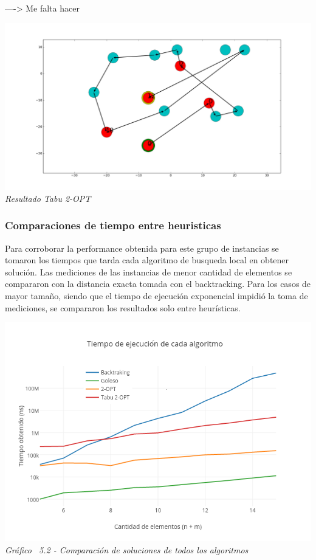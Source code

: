     ----> Me falta hacer
    \vspace*{0.3cm} \vspace*{0.3cm}
  \begin{center}
\includegraphics[scale=0.3]{./EJ5/caminoTabu.png}
\\{\textit{Resultado Tabu 2-OPT}}
  \end{center}
  \vspace*{0.3cm}


\subsubsection{Comparaciones de tiempo entre heuristicas}

Para corroborar la performance obtenida para este grupo de instancias se tomaron los tiempos que tarda cada algoritmo de busqueda local en obtener soluci\'on. 
 Las mediciones de las instancias de menor cantidad de elementos se compararon con la distancia exacta tomada con el backtracking. Para los casos de mayor tamaño, siendo que el tiempo de ejecución exponencial impidió la toma de mediciones, se compararon los resultados solo entre heurísticas.


\vspace*{0.3cm} \vspace*{0.3cm}
  \begin{center}
 \includegraphics[scale=0.5]{./EJ5/medicionTodos.png}\\
 {\textit{Gráfico \ 5.2 - Comparaci\'on de soluciones de todos los algoritmos}}
  \end{center}
  \vspace*{0.3cm}


